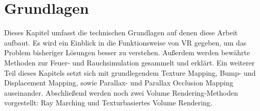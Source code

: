 \section{Grundlagen}
\label{sec:3}
Dieses Kapitel umfasst die technischen Grundlagen auf denen diese Arbeit aufbaut. 
Es wird ein Einblick in die Funktionsweise von VR gegeben, um das Problem bisheriger Lösungen 
besser zu verstehen. Außerdem werden bewährte Methoden zur Feuer- und Rauchsimulation
gesammelt und erklärt. Ein weiterer Teil dieses Kapitels setzt sich mit grundlegendem Texture Mapping,
Bump- und Displacement Mapping, sowie Parallax- und Parallax Occlusion Mapping auseinander. Abschließend 
werden noch zwei Volume Rendering-Methoden vorgestellt: Ray Marching und Texturbasiertes Volume Rendering.







\newpage
